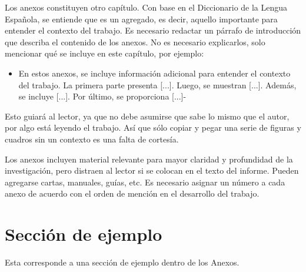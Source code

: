 Los anexos constituyen otro capítulo. Con base en el Diccionario de la Lengua Española, se entiende que es un agregado, es decir, aquello importante para entender el contexto del trabajo. Es necesario redactar un párrafo de introducción que describa el contenido de los anexos. No es necesario explicarlos, solo mencionar qué se incluye en este capítulo, por ejemplo:  

\begin{itemize}
    \item[] En estos anexos, se incluye información adicional para entender el contexto del trabajo. La primera parte presenta [...]. Luego, se muestran [...]. Además, se incluye [...]. Por último, se proporciona [...]-

\end{itemize}

Esto guiará al lector, ya que no debe asumirse que sabe lo mismo que el autor, por algo está leyendo el trabajo. Así que sólo copiar y pegar una serie de figuras y cuadros sin un contexto es una falta de cortesía.

Los anexos incluyen material relevante para mayor claridad y profundidad de la investigación, pero distraen al lector si se colocan en el texto del informe. Pueden agregarse cartas, manuales, guías, etc. Es necesario asignar un número a cada anexo de acuerdo con el orden de mención en el desarrollo del trabajo. 

\section{Sección de ejemplo}

Esta corresponde a una sección de ejemplo dentro de los Anexos.